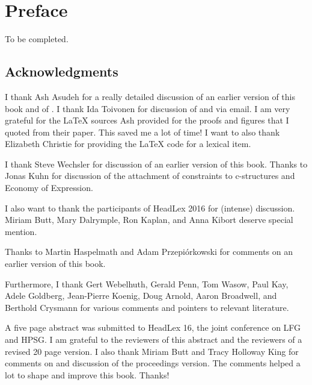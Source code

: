 






\frontmatter
\maketitle

\tableofcontents

%


\chapter{Preface}

To be completed.

\section{Acknowledgments}

I thank Ash Asudeh for a really detailed discussion of an earlier version of this book and of
. I thank Ida Toivonen for discussion of  and 
via email. I am very grateful for the \LaTeX{} sources Ash provided for the proofs and figures
that I quoted from their paper. This saved me a lot of time! I want to also thank Elizabeth Christie
for providing the \LaTeX{} code for a lexical item.

I thank Steve Wechsler for discussion of an earlier version of this book. Thanks to Jonas Kuhn for
discussion of the attachment of constraints to c-structures and Economy of Expression.

I also want to thank the participants of HeadLex 2016 for (intense) discussion. Miriam Butt, Mary Dalrymple,
 Ron Kaplan, and Anna Kibort deserve special mention.

Thanks to Martin Haspelmath and Adam Przepiórkowski for comments on an earlier version of this book.

Furthermore, I thank Gert Webelhuth, Gerald Penn, Tom Wasow, Paul Kay, %
Adele Goldberg, Jean-Pierre Koenig, Doug Arnold, Aaron Broadwell, and Berthold Crysmann for various
comments and pointers to relevant literature.

A five page abstract was submitted to HeadLex 16, the joint conference on LFG and HPSG. I am
grateful to the reviewers of this abstract and the reviewers of a revised 20 page version. I also
thank Miriam Butt and Tracy Holloway King for comments on and discussion of the proceedings version.  The
comments helped a lot to shape and improve this book. Thanks!  


